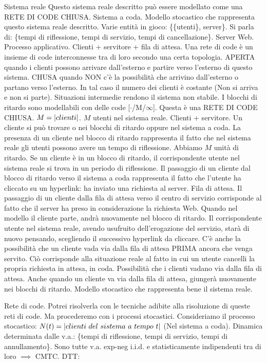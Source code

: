 Sistema reale Questo sistema reale descritto può essere modellato come una RETE DI CODE CHIUSA. Sistema a coda. Modello stocastico che rappresenta questo sistema reale descritto. Varie entità in gioco: \{\{utenti\}, server\}. Si parla di: \{tempi di riflessione, tempi di servizio, tempi di cancellazione\}. Server Web. Processo applicativo. Clienti + servitore + fila di attesa. Una rete di code è un insieme di code interconnesse tra di loro secondo una certa topologia. APERTA quando i clienti possono arrivare dall'esterno e partire verso l'esterno di questo sistema. CHUSA quando NON c'è la possibilità che arrivino dall'esterno o partano verso l'esterno. In tal caso il numero dei clienti è costante (Non si arriva e non si parte). Situazioni intermedie rendono il sistema non stabile. I blocchi di ritardo sono modellabili con delle code [$\mathord{\cdot}$/M/$\infty$]. Questa è una RETE DI CODE CHIUSA. $M=\left\vert{clienti}\right\vert$. $M$ utenti nel sistema reale. Clienti + servitore. Un cliente si può trovare o nei blocchi di ritardo oppure nel sistema a coda. La presenza di un cliente nel blocco di ritardo rappresenta il fatto che nel sistema reale gli utenti possono avere un tempo di riflessione. Abbiamo $M$ unità di ritardo. Se un cliente è in un blocco di ritardo, il corrispondente utente nel sistema reale si trova in un periodo di riflessione. Il passaggio di un cliente dal blocco di ritardo verso il sistema a coda rappresenta il fatto che l'utente ha cliccato su un hyperlink: ha inviato una richiesta al server. Fila di attesa. Il passaggio di un cliente dalla fila di attesa verso il centro di servizio corrisponde al fatto che il server ha preso in considerazione la richiesta Web. Quando nel modello il cliente parte, andrà nuovamente nel blocco di ritardo. Il corrispondente utente nel sistema reale, avendo usufruito dell'erogazione del servizio, starà di nuovo pensando, scegliendo il successivo hyperlink da cliccare. C'è anche la possibilità che un cliente vada via dalla fila di attesa PRIMA ancora che venga servito. Ciò corrisponde alla situazione reale al fatto in cui un utente cancelli la propria richiesta in attesa, in coda. Possibilità che i clienti vadano via dalla fila di attesa. Anche quando un cliente va via dalla fila di attesa, giungerà nuovamente nei blocchi di ritardo. Modello stocastico che rappresenta bene il sistema reale.

Rete di code. Potrei risolverla con le tecniche adibite alla risoluzione di queste reti di code. Ma procederemo con i processi stocastici. Consideriamo il processo stocastico: $N(t)=\cardinality{clienti\ del\ sistema\ a\ tempo\ t}$ (Nel sistema a coda). Dinamica determinata dalle v.a.: \{tempi di riflessione, tempi di servizio, tempi di annullamento\}. Sono tutte v.a. exp-neg i.i.d. e statisticamente indipendenti tra di loro $\implies $ CMTC. DTT:

